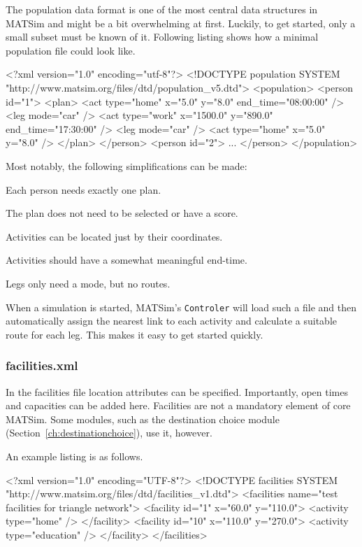 The population data format is one of the most central data structures in MATSim and might be a bit overwhelming at first. Luckily, to get started, only a small subset must be known of it. Following listing shows how a minimal population file could look like. 

\begin{xml}
<?xml version="1.0" encoding="utf-8"?> 
<!DOCTYPE population SYSTEM "http://www.matsim.org/files/dtd/population_v5.dtd"> 
<population> 
   <person id="1"> 
      <plan> 
         <act type="home" x="5.0" y="8.0" end_time="08:00:00" /> 
         <leg mode="car" /> 
         <act type="work" x="1500.0" y="890.0" end_time="17:30:00" /> 
         <leg mode="car" /> 
         <act type="home" x="5.0" y="8.0" /> 
      </plan> 
   </person> 
   <person id="2"> 
      ... 
   </person> 
</population>
\end{xml}

Most notably, the following simplifications can be made:
\begin{compactitem}
\item Each person needs exactly one plan.
\item The plan does not need to be selected or have a score.
\item Activities can be located just by their coordinates.
\item Activities should have a somewhat meaningful end-time.
\item Legs only need a mode, but no routes.
\end{compactitem}
When a simulation is started, MATSim's \lstinline|Controler| will load such a file and then automatically assign the nearest link to each activity and calculate a suitable route for each leg. This makes it easy to get started quickly. 

\subsubsection{facilities.xml}
In the facilities file location attributes can be specified. Importantly, open times and capacities can be added here. Facilities are not a mandatory element of core MATSim. Some modules, such as the destination choice module (Section~\ref{ch:destinationchoice}), use it, however.

An example listing is as follows.
\begin{xml}
<?xml version="1.0" encoding="UTF-8"?>
<!DOCTYPE facilities SYSTEM "http://www.matsim.org/files/dtd/facilities_v1.dtd">
<facilities name="test facilities for triangle network">
	<facility id="1" x="60.0" y="110.0">
		<activity type="home" />
	</facility>
	<facility id="10" x="110.0" y="270.0">
		<activity type="education" />
	</facility>
</facilities>
\end{xml}


